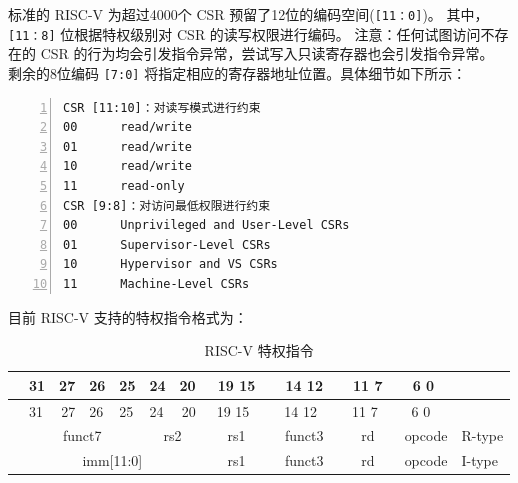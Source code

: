 \documentclass{../runikraft-report}
\begin{document}
标准的 RISC-V 为超过4000个 CSR 预留了12位的编码空间(\texttt{[11：0]})。
其中，\texttt{[11：8]} 位根据特权级别对 CSR 的读写权限进行编码。
注意：任何试图访问不存在的 CSR 的行为均会引发指令异常，尝试写入只读寄存器也会引发指令异常。
剩余的8位编码 \texttt{[7:0]} 将指定相应的寄存器地址位置。具体细节如下所示：\cite{bib:feasibility-b}\cite{bib:feasibility-c}

\begin{lstlisting}[numbers=left]
CSR [11:10]：对读写模式进行约束
00		read/write
01		read/write
10		read/write
11		read-only
CSR [9:8]：对访问最低权限进行约束
00		Unprivileged and User-Level CSRs
01		Supervisor-Level CSRs
10		Hypervisor and VS CSRs
11		Machine-Level CSRs
\end{lstlisting}


目前 RISC-V 支持的特权指令格式为：
{
    \small
    \newcommand{\instbit}[1]{\mbox{\scriptsize #1}}
    \newcommand{\instbitrange}[2]{~\instbit{#1} \hfill \instbit{#2}~}

    \begin{longtable}{p{0in}p{0.4in}p{0.05in}p{0.05in}p{0.05in}p{0.05in}p{0.4in}p{0.6in}p{0.4in}p{0.6in}p{0.7in}l}
    \caption{RISC-V 特权指令}\\
    &
    \multicolumn{1}{l}{\instbit{31}} &
    \multicolumn{1}{r}{\instbit{27}} &
    \instbit{26} &
    \instbit{25} &
    \multicolumn{1}{l}{\instbit{24}} &
    \multicolumn{1}{r}{\instbit{20}} &
    \instbitrange{19}{15} &
    \instbitrange{14}{12} &
    \instbitrange{11}{7} &
    \instbitrange{6}{0} \\
    \cline{2-11}
    \endfirsthead
    &
    \multicolumn{1}{l}{\instbit{31}} &
    \multicolumn{1}{r}{\instbit{27}} &
    \instbit{26} &
    \instbit{25} &
    \multicolumn{1}{l}{\instbit{24}} &
    \multicolumn{1}{r}{\instbit{20}} &
    \instbitrange{19}{15} &
    \instbitrange{14}{12} &
    \instbitrange{11}{7} &
    \instbitrange{6}{0} \\
    \cline{2-11}
    \endhead

    &
    \multicolumn{4}{|c|}{funct7} &
    \multicolumn{2}{c|}{rs2} &
    \multicolumn{1}{c|}{rs1} &
    \multicolumn{1}{c|}{funct3} &
    \multicolumn{1}{c|}{rd} &
    \multicolumn{1}{c|}{opcode} & R-type \\
    \cline{2-11}


    &
    \multicolumn{6}{|c|}{imm[11:0]} &
    \multicolumn{1}{c|}{rs1} &
    \multicolumn{1}{c|}{funct3} &
    \multicolumn{1}{c|}{rd} &
    \multicolumn{1}{c|}{opcode} & I-type \\
    \cline{2-11}



\end{longtable}}
\end{document}
